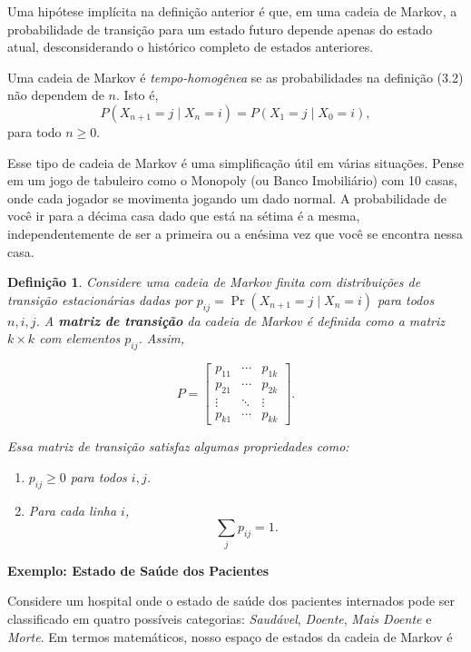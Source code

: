 \documentclass[12pt, a4paper, openany]{book}
\numberwithin{equation}{chapter}
\numberwithin{table}{chapter}
\numberwithin{figure}{chapter}
\theoremstyle{break}
\newtheorem{definition}{Defini\c{c}\~ao}[section]
\begin{document}
Uma hipótese implícita na definição anterior é que, em uma cadeia de Markov, a probabilidade de transição para um estado futuro depende apenas do estado atual, desconsiderando o histórico completo de estados anteriores.




Uma cadeia de Markov é \textit{tempo-homogênea} se as probabilidades na definição (3.2) não dependem de \( n \). Isto é,
\[
P(X_{n+1} = j \mid X_n = i) = P(X_1 = j \mid X_0 = i),
\]
para todo \( n \geq 0 \). 

Esse tipo de cadeia de Markov é uma simplificação útil em várias situações. Pense em um jogo de tabuleiro como o Monopoly (ou Banco Imobiliário) com 10 casas, onde cada jogador se movimenta jogando um dado normal. A probabilidade de você ir para a décima casa dado que está na sétima é a mesma, independentemente de ser a primeira ou a enésima vez que você se encontra nessa casa.





\begin{definition}{}

Considere uma cadeia de Markov finita com distribuições de transição estacionárias dadas por \( p_{ij} = \Pr(X_{n+1} = j \mid X_n = i) \) para todos \( n, i, j \). A \textbf{matriz de transição} da cadeia de Markov é definida como a matriz \( k \times k \) com elementos \( p_{ij} \). Assim,

\[
P = \begin{bmatrix}
p_{11} & \cdots & p_{1k} \\
p_{21} & \cdots & p_{2k} \\
\vdots & \ddots & \vdots \\
p_{k1} & \cdots & p_{kk}
\end{bmatrix}.
\]


Essa matriz de transição satisfaz algumas propriedades como:
\begin{enumerate}
    \item \( p_{ij} \geq 0 \) para todos \( i, j \).
    \item Para cada linha \( i \),
    \[
    \sum_j p_{ij} = 1.
    \]
\end{enumerate}
\end{definition}




\textbf{Exemplo: Estado de Saúde dos Pacientes}



Considere um hospital onde o estado de saúde dos pacientes internados pode ser classificado em quatro possíveis categorias: \textit{Saudável}, \textit{Doente}, \textit{Mais Doente} e \textit{Morte}. Em termos matemáticos, nosso espaço de estados da cadeia de Markov é
\end{document}
